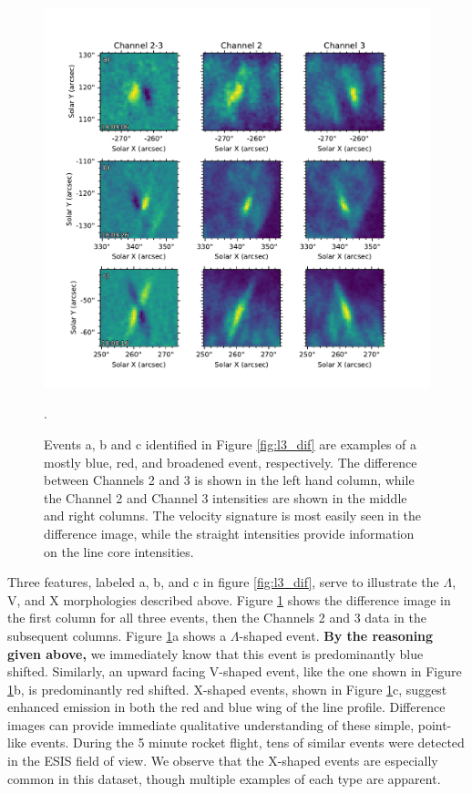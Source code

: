 \documentclass[linenumbers,trackchanges]{aastex63}
\begin{document}
   	
 		\begin{figure}
  			\centering
  			\includegraphics{dif_events}
  			\caption{Events a, b and c identified in Figure \ref{fig:l3_dif} are examples of a mostly blue, red, and broadened event, respectively. The difference between Channels 2 and 3 is shown in the left hand column, while the Channel 2 and Channel 3 intensities are shown in the middle and right columns.  The velocity signature is most easily seen in the difference image, while the straight intensities provide information on the line core intensities. 
  			}
  			\label{fig:dif_events}. 
  		\end{figure}


    	Three features, labeled a, b, and c in figure \ref{fig:l3_dif}, serve to illustrate the $\Lambda$, V, and X morphologies described above.
Figure \ref{fig:dif_events} shows the difference image in the first column for all three events, then the Channels 2 and 3 data in the subsequent columns. 
    	Figure \ref{fig:dif_events}a shows a $\Lambda$-shaped event.
\textbf{By the reasoning given above,} we immediately know that this event is predominantly blue shifted.  
    	Similarly, an upward facing V-shaped event, like the one shown in Figure \ref{fig:dif_events}b, is predominantly red shifted.
    	X-shaped events, shown in Figure \ref{fig:dif_events}c, suggest enhanced emission in both the red and blue wing of the line profile. 
    	Difference images can provide immediate qualitative understanding of these simple, point-like events.  
    	During the 5 minute rocket flight, tens of similar events were detected in the ESIS field of view.  
    	We observe that the X-shaped events are especially common in this dataset, though multiple examples of each 
    	type are apparent.
    	
\end{document}
